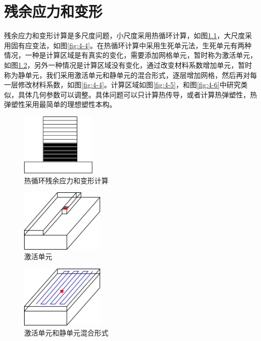 \chapter{残余应力和变形}

残余应力和变形计算是多尺度问题，小尺度采用热循环计算，如图\ref{fig:4-1}，大尺度采用固有应变法，如图\ref{fig:4-4}。在热循环计算中采用生死单元法，生死单元有两种情况，一种是计算区域是有真实的变化，需要添加网格单元，暂时称为激活单元，如图\ref{fig:4-2}，另外一种情况是计算区域没有变化，通过改变材料系数增加单元，暂时称为静单元，我们采用激活单元和静单元的混合形式，逐层增加网格，然后再对每一层修改材料系数，如图\ref{fig:4-4}。计算区域如图\ref{fig:4-5}，和图\ref{fig:4-6}中研究类似，具体几何参数可以调整。具体问题可以只计算热传导，或者计算热弹塑性，热弹塑性采用最简单的理想塑性本构。

\begin{figure}[!htbp]
  \centering
  \includegraphics[height=3cm]{fig/4/1.png}
  \caption{热循环残余应力和变形计算}
  \label{fig:4-1}
\end{figure}

\begin{figure}[!htbp]
  \centering
  \includegraphics[height=3cm]{fig/4/2.png}
  \caption{激活单元}
  \label{fig:4-2}
\end{figure}

\begin{figure}[!htbp]
  \centering
  \includegraphics[height=3cm]{fig/4/3.png}
  \caption{激活单元和静单元混合形式}
  \label{fig:4-3}
\end{figure}

